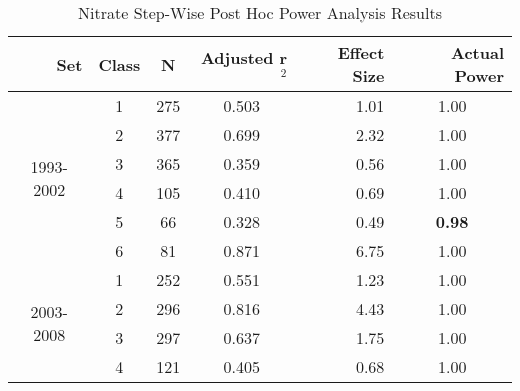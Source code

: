 \begin{table}\tiny
  \centering
	\caption{Nitrate Step-Wise Post Hoc Power Analysis Results}
    \begin{tabular}{rrcrrr}
    \toprule
    Set   & Class & N     & Adjusted r$^2$ & \multicolumn{1}{p{.5cm}}{Effect Size} & Actual Power \\
    \midrule
    \multicolumn{1}{c}{\multirow{6}[1]{*}{\begin{sideways}1993-2002\end{sideways}}} & \multicolumn{1}{c}{1} & \multicolumn{1}{c}{275} & \multicolumn{1}{c}{0.503 } & \multicolumn{1}{r}{1.01 } & \multicolumn{1}{c}{1.00 } \\
    \multicolumn{1}{c}{} & \multicolumn{1}{c}{2} & \multicolumn{1}{c}{377} & \multicolumn{1}{c}{0.699 } & \multicolumn{1}{r}{2.32 } & \multicolumn{1}{c}{1.00 } \\
    \multicolumn{1}{c}{} & \multicolumn{1}{c}{3} & \multicolumn{1}{c}{365} & \multicolumn{1}{c}{0.359 } & \multicolumn{1}{r}{0.56 } & \multicolumn{1}{c}{1.00 } \\
    \multicolumn{1}{c}{} & \multicolumn{1}{c}{4} & \multicolumn{1}{c}{105} & \multicolumn{1}{c}{0.410 } & \multicolumn{1}{r}{0.69 } & \multicolumn{1}{c}{1.00 } \\
    \multicolumn{1}{c}{} & \multicolumn{1}{c}{5} & \multicolumn{1}{c}{66} & \multicolumn{1}{c}{0.328 } & \multicolumn{1}{r}{0.49 } & \multicolumn{1}{c}{\textbf{0.98}} \\
    \multicolumn{1}{c}{} & \multicolumn{1}{c}{6} & \multicolumn{1}{c}{81} & \multicolumn{1}{c}{0.871 } & \multicolumn{1}{r}{6.75 } & \multicolumn{1}{c}{1.00 } \\\midrule
    \multicolumn{1}{c}{\multirow{6}[2]{*}{\begin{sideways}2003-2008\end{sideways}}} & \multicolumn{1}{c}{1} & \multicolumn{1}{c}{252} & \multicolumn{1}{c}{0.551 } & \multicolumn{1}{r}{1.23 } & \multicolumn{1}{c}{1.00 } \\
    \multicolumn{1}{c}{} & \multicolumn{1}{c}{2} & \multicolumn{1}{c}{296} & \multicolumn{1}{c}{0.816 } & \multicolumn{1}{r}{4.43 } & \multicolumn{1}{c}{1.00 } \\
    \multicolumn{1}{c}{} & \multicolumn{1}{c}{3} & \multicolumn{1}{c}{297} & \multicolumn{1}{c}{0.637 } & \multicolumn{1}{r}{1.75 } & \multicolumn{1}{c}{1.00 } \\
    \multicolumn{1}{c}{} & \multicolumn{1}{c}{4} & \multicolumn{1}{c}{121} & \multicolumn{1}{c}{0.405 } & \multicolumn{1}{r}{0.68 } & \multicolumn{1}{c}{1.00 } \\

\end{tabular}
\end{table}
